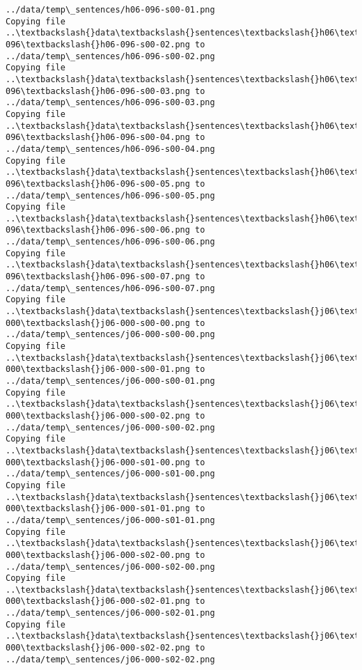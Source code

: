 \documentclass[11pt]{article}
\begin{document}
\begin{Verbatim}[commandchars=\\\{\}]
../data/temp\_sentences/h06-096-s00-01.png
Copying file ..\textbackslash{}data\textbackslash{}sentences\textbackslash{}h06\textbackslash{}h06-096\textbackslash{}h06-096-s00-02.png to
../data/temp\_sentences/h06-096-s00-02.png
Copying file ..\textbackslash{}data\textbackslash{}sentences\textbackslash{}h06\textbackslash{}h06-096\textbackslash{}h06-096-s00-03.png to
../data/temp\_sentences/h06-096-s00-03.png
Copying file ..\textbackslash{}data\textbackslash{}sentences\textbackslash{}h06\textbackslash{}h06-096\textbackslash{}h06-096-s00-04.png to
../data/temp\_sentences/h06-096-s00-04.png
Copying file ..\textbackslash{}data\textbackslash{}sentences\textbackslash{}h06\textbackslash{}h06-096\textbackslash{}h06-096-s00-05.png to
../data/temp\_sentences/h06-096-s00-05.png
Copying file ..\textbackslash{}data\textbackslash{}sentences\textbackslash{}h06\textbackslash{}h06-096\textbackslash{}h06-096-s00-06.png to
../data/temp\_sentences/h06-096-s00-06.png
Copying file ..\textbackslash{}data\textbackslash{}sentences\textbackslash{}h06\textbackslash{}h06-096\textbackslash{}h06-096-s00-07.png to
../data/temp\_sentences/h06-096-s00-07.png
Copying file ..\textbackslash{}data\textbackslash{}sentences\textbackslash{}j06\textbackslash{}j06-000\textbackslash{}j06-000-s00-00.png to
../data/temp\_sentences/j06-000-s00-00.png
Copying file ..\textbackslash{}data\textbackslash{}sentences\textbackslash{}j06\textbackslash{}j06-000\textbackslash{}j06-000-s00-01.png to
../data/temp\_sentences/j06-000-s00-01.png
Copying file ..\textbackslash{}data\textbackslash{}sentences\textbackslash{}j06\textbackslash{}j06-000\textbackslash{}j06-000-s00-02.png to
../data/temp\_sentences/j06-000-s00-02.png
Copying file ..\textbackslash{}data\textbackslash{}sentences\textbackslash{}j06\textbackslash{}j06-000\textbackslash{}j06-000-s01-00.png to
../data/temp\_sentences/j06-000-s01-00.png
Copying file ..\textbackslash{}data\textbackslash{}sentences\textbackslash{}j06\textbackslash{}j06-000\textbackslash{}j06-000-s01-01.png to
../data/temp\_sentences/j06-000-s01-01.png
Copying file ..\textbackslash{}data\textbackslash{}sentences\textbackslash{}j06\textbackslash{}j06-000\textbackslash{}j06-000-s02-00.png to
../data/temp\_sentences/j06-000-s02-00.png
Copying file ..\textbackslash{}data\textbackslash{}sentences\textbackslash{}j06\textbackslash{}j06-000\textbackslash{}j06-000-s02-01.png to
../data/temp\_sentences/j06-000-s02-01.png
Copying file ..\textbackslash{}data\textbackslash{}sentences\textbackslash{}j06\textbackslash{}j06-000\textbackslash{}j06-000-s02-02.png to
../data/temp\_sentences/j06-000-s02-02.png

\end{Verbatim}
\end{document}
